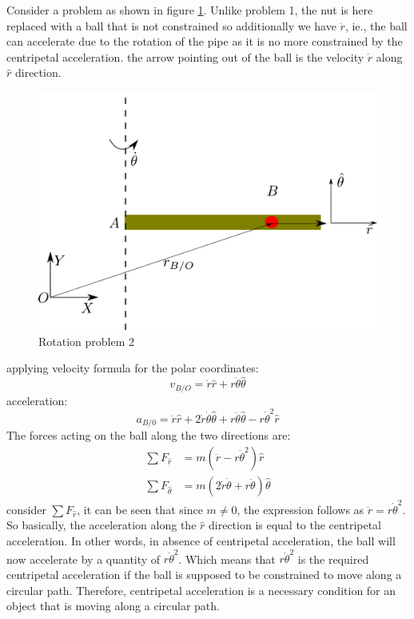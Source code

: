 Consider a problem as shown in figure \ref{Fig_RotationProblem_2}. Unlike problem 1, the nut is here replaced with a ball that is not constrained so additionally we have $\ddot{r}$, ie., the ball can accelerate due to the rotation of the pipe as it is no more constrained by the centripetal acceleration. the arrow pointing out of the ball is the velocity $\dot{r}$ along $\hat{r}$ direction.
\newpage
\begin{figure}[h!]
	\centering
	\includegraphics[width=0.65\linewidth]{Bilder/08_RotationProblem2.pdf}
	\caption{Rotation problem 2}
	\label{Fig_RotationProblem_2}
\end{figure}
applying velocity formula for the polar coordinates:
\begin{equation}
	v_{B/O} = \dot{r}\hat{r} + r \dot{\theta} \hat{\theta}
\end{equation}
acceleration:
\begin{equation}
	a_{B/0} = \ddot{r}\hat{r} + 2 \dot{r} \dot{\theta} \hat{\theta} +  r \ddot{\theta} \hat{\theta} - r \dot{\theta}^{2} \hat{r}
\end{equation}
The forces acting on the ball along the two directions are:
\begin{align}
	\sum F_{\hat{r}} &= m (\ddot{r} - r \dot{\theta}^{2}) \hat{r} \\
	\sum F_{\hat{\theta}} &= m (2 \dot{r} \dot{\theta} + r \ddot{\theta})\hat{\theta}
\end{align}
consider $\sum F_{\hat{r}}$, it can be seen that since $m \neq 0$, the expression follows as $\ddot{r} = r \dot{\theta}^{2}$. So basically, the acceleration along the $\hat{r}$ direction is equal to the centripetal acceleration. In other words, in absence of centripetal acceleration, the ball will now accelerate by a quantity of $r \dot{\theta}^{2}$. Which means that $r \dot{\theta}^{2}$ is the required centripetal acceleration if the ball is supposed to be constrained to move along a circular path. Therefore, centripetal acceleration is a necessary condition for an object that is moving along a circular path.

